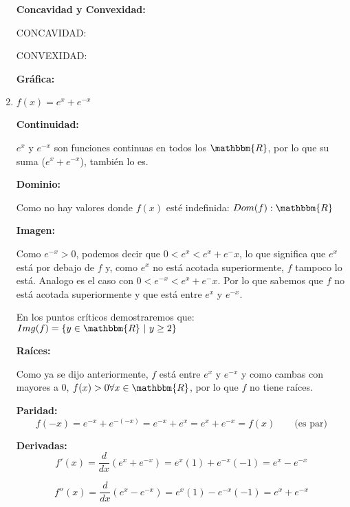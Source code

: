 \documentclass[12pt]{article}
\begin{document}
\begin{enumerate}[\hspace{9px} a)]
        \textbf{Concavidad y Convexidad: }\medskip
        
        CONCAVIDAD:
        
        CONVEXIDAD:

        \textbf{Gr\'afica: }

    \item \(f(x)=e^x+e^{-x}\)\medskip
    
        \textbf{Continuidad: }\medskip

            \(e^x\) y \(e^{-x}\) son funciones continuas en todos los \(\mathbbm{R}\), por lo que su suma (\(e^x+e^{-x}\)), tambi\'en lo es.\medskip

        \textbf{Dominio: }\medskip

            Como no hay valores donde $f(x)$ est\'e indefinida: \(Dom(f):\mathbbm{R}\)\medskip

        \textbf{Imagen: }\medskip

            Como \(e^{-x}>0\), podemos decir que \(0<e^x<e^x+e^-x\), lo que significa que \(e^x\) est\'a por debajo de \(f\) y, como \(e^x\) no est\'a acotada superiormente, \(f\) tampoco lo est\'a. Analogo es el caso con \(0<e^{-x}<e^x+e^-x\). Por lo que sabemos que \(f\) no est\'a acotada superiormente y que est\'a entre \(e^x\) y \(e^{-x}\).\medskip

            En los puntos cr\'iticos demostraremos que: \(Img(f)=\{y\in\mathbbm{R} \ | \ y\geq2\}\)\medskip

        \textbf{Ra\'ices: }\medskip

            Como ya se dijo anteriormente, \(f\) est\'a entre \(e^x\) y \(e^{-x}\) y como cambas con mayores a 0, \(f(x)>0 \forall x \in \mathbbm{R}\), por lo que \(f\) no tiene ra\'ices.\medskip

        \textbf{Paridad: }
            \begin{equation*}
                f(-x) = e^{-x}+e^{-(-x)} = e^{-x}+e^x = e^x+e^{-x} = f(x) \qquad \text{(es par)}
            \end{equation*}

        \textbf{Derivadas: }
            \begin{equation*}
                f'(x) = \frac{d}{dx}\left(e^x+e^{-x}\right) = e^x(1)+e^{-x}(-1) = e^x-e^{-x}
            \end{equation*}

            \begin{equation*}
                f''(x) = \frac{d}{dx}\left(e^x-e^{-x}\right) = e^x(1)-e^{-x}(-1) = e^x+e^{-x}
            \end{equation*}


\end{enumerate}
\end{document}
